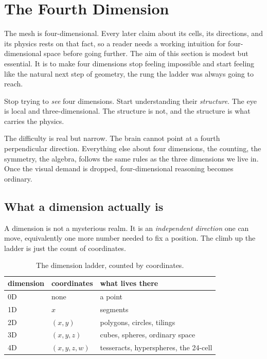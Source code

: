 \section{The Fourth Dimension}

The mesh is four-dimensional. Every later claim about its cells, its directions, and its physics rests on that fact, so a reader needs a working intuition for four-dimensional space before going further. The aim of this section is modest but essential. It is to make four dimensions stop feeling impossible and start feeling like the natural next step of geometry, the rung the ladder was always going to reach.

\begin{principle}
Stop trying to \emph{see} four dimensions. Start understanding their \emph{structure}. The eye is local and three-dimensional. The structure is not, and the structure is what carries the physics.
\end{principle}

The difficulty is real but narrow. The brain cannot point at a fourth perpendicular direction. Everything else about four dimensions, the counting, the symmetry, the algebra, follows the same rules as the three dimensions we live in. Once the visual demand is dropped, four-dimensional reasoning becomes ordinary.

\subsection{What a dimension actually is}

A dimension is not a mysterious realm. It is an \emph{independent direction} one can move, equivalently one more number needed to fix a position. The climb up the ladder is just the count of coordinates.

\begin{table}[ht]
\centering
\begin{tabular}{@{}lll@{}}
\toprule
dimension & coordinates & what lives there \\
\midrule
0D & none & a point \\
1D & $x$ & segments \\
2D & $(x, y)$ & polygons, circles, tilings \\
3D & $(x, y, z)$ & cubes, spheres, ordinary space \\
4D & $(x, y, z, w)$ & tesseracts, hyperspheres, the 24-cell \\
\bottomrule
\end{tabular}
\caption{The dimension ladder, counted by coordinates.}
\label{tab:dimension-ladder}
\end{table}

